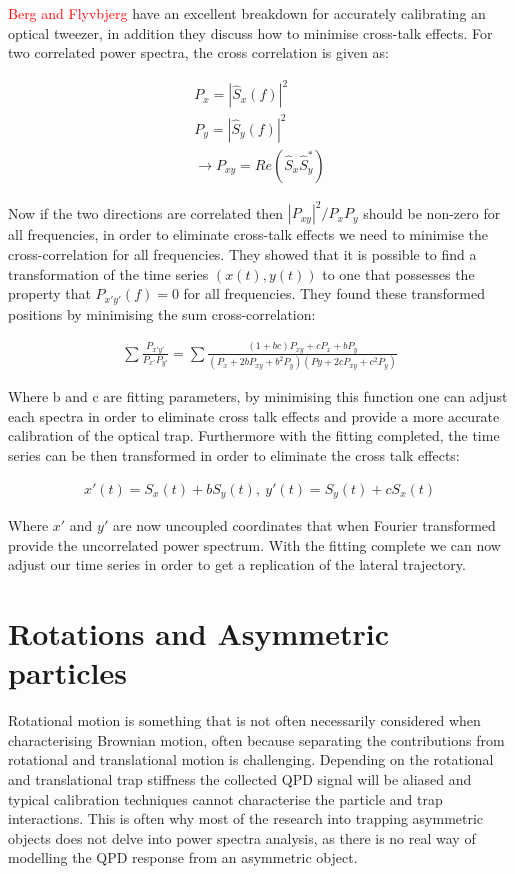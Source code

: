 \documentclass[a4paper,oneside,11pt]{book}
\begin{document}
\textcolor{red}{Berg and Flyvbjerg} have an excellent breakdown for accurately calibrating an optical tweezer, in addition they discuss how to minimise cross-talk effects. For two correlated power spectra, the cross correlation is given as:

\begin{align}
	P_{x} = |\hat{S}_x(f)|^2 \\ 
	P_{y} = |\hat{S}_y(f)|^2 \\
	\rightarrow P_{xy} = Re(\hat{S}_x\hat{S}^*_y)
\end{align}

Now if the two directions are correlated then $|P_{xy}|^2/P_xP_y$  should be non-zero for all frequencies, in order to eliminate cross-talk effects we need to minimise the cross-correlation for all frequencies. They showed that it is possible to find a transformation of the time series $(x(t), y(t))$  to one that possesses the property that $P_{x'y'}(f)=0$ for all frequencies. They found these transformed positions by minimising the sum cross-correlation:

\begin{align}
	\sum\frac{P_{x'y'}}{P_{x'}P_{y'}} = \sum\frac{(1+bc)P_{xy}+cP_x+bP_y}{(P_x+2bP_{xy}+b^2P_y)(Py+2cP_{xy}+c^2P_y)}
\end{align}

Where b and c are fitting parameters, by minimising this function one can adjust each spectra in order to eliminate cross talk effects and provide a more accurate calibration of the optical trap. Furthermore with the fitting completed, the time series can be then transformed in order to eliminate the cross talk effects:

\begin{align}
	x'(t) = S_x(t) + bS_y(t),\ y'(t) = S_y(t) + cS_x(t)
\end{align}

Where $x'$ and $y'$ are now uncoupled coordinates that when Fourier transformed provide the uncorrelated power spectrum. With the fitting complete we can now adjust our time series in order to get a replication of the lateral trajectory. 

\section{Rotations and Asymmetric particles}
Rotational motion is something that is not often necessarily considered when characterising Brownian motion, often because separating the contributions from rotational and translational motion is challenging. Depending on the rotational and translational trap stiffness the collected QPD signal will be aliased and typical calibration techniques cannot characterise the particle and trap interactions. This is often why most of the research into trapping asymmetric objects does not delve into power spectra analysis, as there is no real way of modelling the QPD response from an asymmetric object. 
\end{document}
